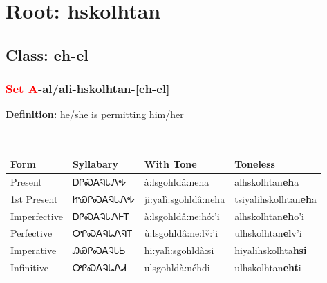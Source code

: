 \needspace{4in}
\section*{Root: hskolhtan}
\nopagebreak
{}
\needspace{3in}
\subsection*{Class: eh-el}
\nopagebreak
\needspace{2in}
\subsubsection*{\textcolor{Red}{Set A}{-}al/ali{-}\textbf{hskolhtan}{-}[eh-el]}
\nopagebreak
\textbf{Definition: } he/she is permitting him/her
\\[0.5em]
\begin{tabularx}{\textwidth}{l X X X}%
\toprule%
\textbf{Form}&\textbf{Syllabary}&\textbf{With Tone}&\textbf{Toneless}\\%
\midrule%
Present&ᎠᎵᏍᎪᎸᏓᏁᎭ&à:lsgohldâ:neha&alhskolhtan\textbf{eh}a\\%
1st Present&ᏥᏯᎵᏍᎪᎸᏓᏁᎭ&ji:yalì:sgohldâ:neha&tsiyalihskolhtan\textbf{eh}a\\%
Imperfective&ᎠᎵᏍᎪᎸᏓᏁᎰᎢ&à:lsgohldâ:ne:hó:’i&alhskolhtan\textbf{eh}o'i\\%
Perfective&ᎤᎵᏍᎪᎸᏓᏁᎸᎢ&ù:lsgohldâ:ne:lv̌:’i&ulhskolhtan\textbf{el}v'i\\%
Imperative&ᎯᏯᎵᏍᎪᎸᏓᏏ&hi:yalì:sgohldà:si&hiyalihskolhta\textbf{hsi}\\%
Infinitive&ᎤᎵᏍᎪᎸᏓᏁᏗ&ulsgohldà:néhdi&ulhskolhtan\textbf{eht}i\\%
\bottomrule%
\end{tabularx}
\\[1em]